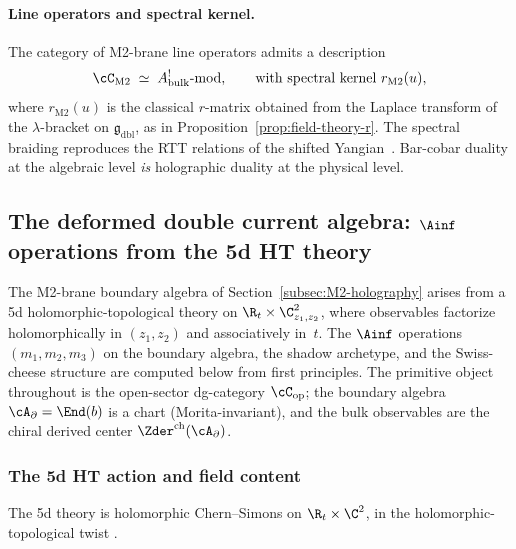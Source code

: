 \paragraph{Line operators and spectral kernel.}
The category of M2-brane line operators admits a description
\[
 \cC_{\mathrm{M2}}
 \;\simeq\;
 A^!_{\mathrm{bulk}}\text{-}\mathrm{mod},
 \qquad
 \text{with spectral kernel } r_{\mathrm{M2}}(u),
\]
where $r_{\mathrm{M2}}(u)$ is the classical $r$-matrix obtained from the
Laplace transform of the $\lambda$-bracket on $\mathfrak{g}_{\mathrm{dbl}}$,
as in Proposition~\ref{prop:field-theory-r}. The spectral braiding
reproduces the RTT relations of the shifted Yangian~\cite{DNP2025}.
Bar-cobar duality at the algebraic level
\emph{is} holographic duality at the physical level.

\subsection{The deformed double current algebra: \texorpdfstring{$\Ainf$}{A-infinity}
 operations from the 5d HT theory}
\label{subsec:DDCA-ainfty}

The M2-brane boundary algebra of Section~\ref{subsec:M2-holography}
arises from a 5d holomorphic-topological theory on
$\R_t \times \C^2_{z_1,z_2}$, where observables factorize
holomorphically in $(z_1,z_2)$ and associatively in~$t$.
The $\Ainf$ operations $(m_1,m_2,m_3)$
on the boundary algebra, the shadow archetype, and the Swiss-cheese
structure are computed below from first principles. The primitive object throughout is the
open-sector dg-category $\cC_{\mathrm{op}}$; the boundary
algebra $\cA_\partial = \End(b)$ is a chart
(Morita-invariant), and the bulk observables are the chiral
derived center $\Zder^{\mathrm{ch}}(\cA_\partial)$.

\subsubsection{The 5d HT action and field content}

The 5d theory is holomorphic Chern--Simons on
$\R_t\times\C^2$, in the holomorphic-topological twist
\cite{costello-gaiotto,Costello-1705.02500v1}.


